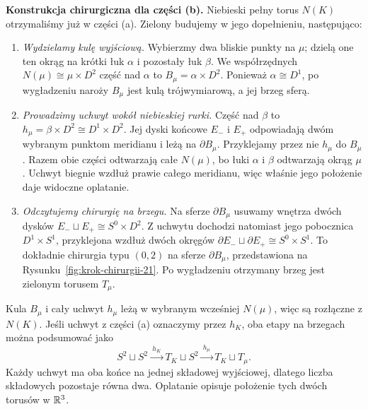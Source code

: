 \noindent\textbf{Konstrukcja chirurgiczna dla części (b).}
Niebieski pełny torus $N(K)$ otrzymaliśmy już w części (a).
Zielony budujemy w jego dopełnieniu, następująco:
\begin{enumerate}[label=(\roman*)]
 10000 10000 10000 0
\item \emph{Wydzielamy kulę wyjściową.}
Wybierzmy dwa bliskie punkty na $\mu$; dzielą one ten okrąg
na krótki łuk $\alpha$ i pozostały łuk $\beta$.
We współrzędnych $N(\mu)\cong\mu\times D^2$
część nad $\alpha$ to $B_\mu=\alpha\times D^2$.
Ponieważ $\alpha\cong D^1$, po wygładzeniu naroży
$B_\mu$ jest kulą trójwymiarową, a jej brzeg sferą.
\item \emph{Prowadzimy uchwyt wokół niebieskiej rurki.}
Część nad $\beta$ to $h_\mu=\beta\times D^2\cong D^1\times D^2$.
Jej dyski końcowe $E_-$ i $E_+$ odpowiadają dwóm wybranym
punktom meridianu i leżą na $\partial B_\mu$.
Przyklejamy przez nie $h_\mu$ do $B_\mu$.
Razem obie części odtwarzają całe $N(\mu)$,
bo łuki $\alpha$ i $\beta$ odtwarzają okrąg $\mu$.
Uchwyt biegnie wzdłuż prawie całego meridianu,
więc właśnie jego położenie daje widoczne oplatanie.
\item \emph{Odczytujemy chirurgię na brzegu.}
Na sferze $\partial B_\mu$ usuwamy wnętrza dwóch dysków
$E_-\sqcup E_+\cong S^0\times D^2$.
Z uchwytu dochodzi natomiast jego pobocznica
$D^1\times S^1$, przyklejona wzdłuż dwóch okręgów
$\partial E_-\sqcup\partial E_+\cong S^0\times S^1$.
To dokładnie chirurgia typu $(0,2)$ na sferze
$\partial B_\mu$, przedstawiona na Rysunku~\ref{fig:krok-chirurgii-21}.
Po wygładzeniu otrzymany brzeg jest zielonym torusem $T_\mu$.
\end{enumerate}
Kula $B_\mu$ i cały uchwyt $h_\mu$ leżą w wybranym wcześniej
$N(\mu)$, więc są rozłączne z $N(K)$.
Jeśli uchwyt z części (a) oznaczymy przez $h_K$, oba etapy
na brzegach można podsumować jako
\[
 S^2\sqcup S^2
 \xrightarrow{\ h_K\ } T_K\sqcup S^2
 \xrightarrow{\ h_\mu\ } T_K\sqcup T_\mu.
\]
Każdy uchwyt ma oba końce na jednej składowej wyjściowej,
dlatego liczba składowych pozostaje równa dwa.
Oplatanie opisuje położenie tych dwóch torusów w $\mathbb{R}^3$.

